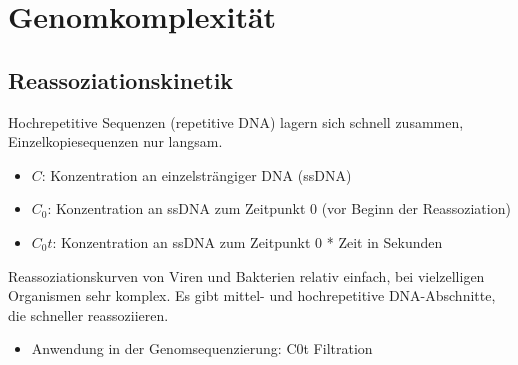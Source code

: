 \section{Genomkomplexität}\label{sec:genomkomplexitat}

\subsection{Reassoziationskinetik}\label{subsec:reassoziationskinetik}
Hochrepetitive Sequenzen (repetitive DNA) lagern sich schnell zusammen, Einzelkopiesequenzen nur langsam.


\begin{itemize}
    \item $C$: Konzentration an einzelsträngiger DNA (ssDNA)
    \item $C_0$: Konzentration an ssDNA zum Zeitpunkt 0 (vor Beginn der Reassoziation)
    \item $C_{0}t$: Konzentration an ssDNA zum Zeitpunkt 0 * Zeit in Sekunden
\end{itemize}

Reassoziationskurven von Viren und Bakterien relativ einfach, bei vielzelligen Organismen sehr komplex.
Es gibt mittel- und hochrepetitive DNA-Abschnitte,
die schneller reassoziieren.

\begin{itemize}
    \item Anwendung in der Genomsequenzierung: C0t Filtration
\end{itemize}


